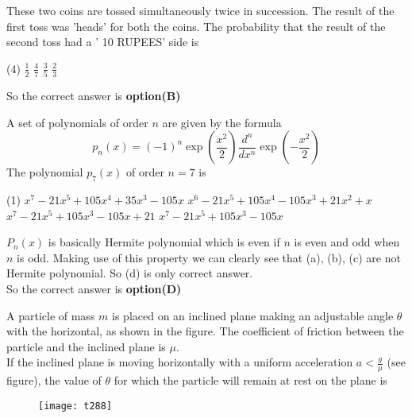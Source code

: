 \begin{questions}
\begin{minipage}{\textwidth}
	These two coins are tossed simultaneously twice in succession.
	The result of the first toss was 'heads' for both the coins. The probability that the result of the second toss had a ' 10 RUPEES' side is
\end{minipage}
\begin{tasks}(4)
	\task[\textbf{A.}]   $\frac{1}{2}$
	\task[\textbf{B.}]   $\frac{4}{7}$
	\task[\textbf{C.}]   $\frac{3}{5}$
	\task[\textbf{D.}]   $\frac{2}{3}$
\end{tasks}
\begin{answer}
	So the correct answer is \textbf{option(B)}
\end{answer}
\begin{minipage}{\textwidth}
	\question A set of polynomials of order $n$ are given by the formula
	$$
	p_{n}(x)=(-1)^{n} \exp \left(\frac{x^{2}}{2}\right) \frac{d^{n}}{d x^{n}} \exp \left(-\frac{x^{2}}{2}\right)
	$$
	The polynomial $p_{7}(x)$ of order $n=7$ is
\end{minipage}
\begin{tasks}(1)
	\task[\textbf{A.}] $x^{7}-21 x^{5}+105 x^{4}+35 x^{3}-105 x$
	\task[\textbf{B.}]   $x^{6}-21 x^{5}+105 x^{4}-105 x^{3}+21 x^{2}+x$
	\task[\textbf{C.}] $x^{7}-21 x^{5}+105 x^{3}-105 x+21$
	\task[\textbf{D.}] $x^{7}-21 x^{5}+105 x^{3}-105 x$
\end{tasks}
\begin{answer}
	$P_{n}(x)$ is basically Hermite polynomial which is even if $n$ is even and odd when $n$ is odd. Making use of this property we can clearly see that (a), (b), (c) are not Hermite polynomial. So (d) is only correct answer.\\
	So the correct answer is \textbf{option(D)}
\end{answer}
\begin{minipage}{\textwidth}
	\question A particle of mass $m$ is placed on an inclined plane making an adjustable angle $\theta$ with the horizontal, as shown in the figure. The coefficient of friction between the particle and the inclined plane is $\mu$.\\
	If the inclined plane is moving horizontally with a uniform acceleration $a<\frac{g}{\mu}$ (see figure), the value of $\theta$ for which the particle will remain at rest on the plane is
\end{minipage}
\begin{figure}[H]
	\centering
	\texttt{[image: t288]}
\end{figure}

\end{questions}
